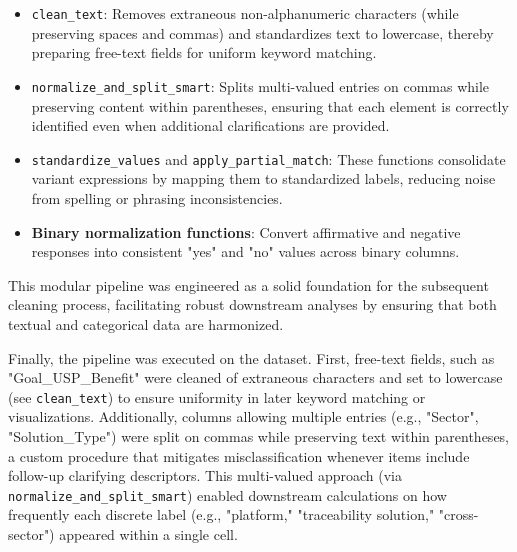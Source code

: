 \begin{itemize}[itemsep=0.5\baselineskip]
    \item \verb|clean_text|: Removes extraneous non-alphanumeric characters (while preserving spaces and commas) and standardizes text to lowercase, thereby preparing free-text fields for uniform keyword matching.

    \item \verb|normalize_and_split_smart|: Splits multi-valued entries on commas while preserving content within parentheses, ensuring that each element is correctly identified even when additional clarifications are provided.
    
    \item \verb|standardize_values| and \verb|apply_partial_match|: These functions consolidate variant expressions by mapping them to standardized labels, reducing noise from spelling or phrasing inconsistencies.
    
    \item \textbf{Binary normalization functions}: Convert affirmative and negative responses into consistent "yes" and "no" values across binary columns.
\end{itemize}

This modular pipeline was engineered as a solid foundation for the subsequent cleaning process, facilitating robust downstream analyses by ensuring that both textual and categorical data are harmonized.

Finally, the pipeline was executed on the dataset. First, free-text fields, such as "Goal\_USP\_Benefit" were cleaned of extraneous characters and set to lowercase (see \verb|clean_text|) to ensure uniformity in later keyword matching or visualizations. Additionally, columns allowing multiple entries (e.g., "Sector", "Solution\_Type") were split on commas while preserving text within parentheses, a custom procedure that mitigates misclassification whenever items include follow-up clarifying descriptors. This multi-valued approach (via \verb|normalize_and_split_smart|) enabled downstream calculations on how frequently each discrete label (e.g., "platform," "traceability solution," "cross-sector") appeared within a single cell.

